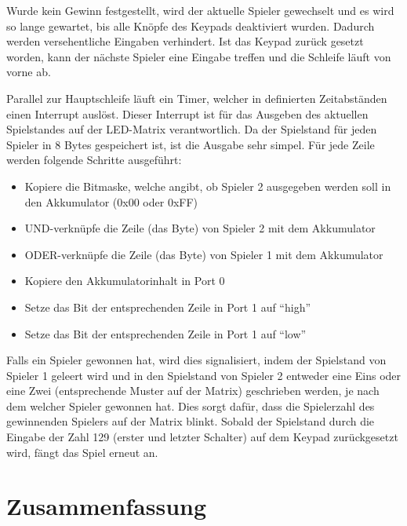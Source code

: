 Wurde kein Gewinn festgestellt, wird der aktuelle Spieler gewechselt und es wird so lange gewartet, bis alle Knöpfe des Keypads deaktiviert wurden. Dadurch werden versehentliche Eingaben verhindert. 
Ist das Keypad zurück gesetzt worden, kann der nächste Spieler eine Eingabe treffen und die Schleife läuft von vorne ab.

Parallel zur Hauptschleife läuft ein Timer, welcher in definierten Zeitabständen einen Interrupt auslöst.
Dieser Interrupt ist für das Ausgeben des aktuellen Spielstandes auf der LED-Matrix verantwortlich. 
Da der Spielstand für jeden Spieler in 8 Bytes gespeichert ist, ist die Ausgabe sehr simpel. Für jede Zeile werden folgende Schritte ausgeführt:
\begin{itemize}
	\item Kopiere die Bitmaske, welche angibt, ob Spieler 2 ausgegeben werden soll in den Akkumulator (0x00 oder 0xFF)
	\item UND-verknüpfe die Zeile (das Byte) von Spieler 2 mit dem Akkumulator
	\item ODER-verknüpfe die Zeile (das Byte) von Spieler 1 mit dem Akkumulator
	\item Kopiere den Akkumulatorinhalt in Port 0
	\item Setze das Bit der entsprechenden Zeile in Port 1 auf \enquote{high}
	\item Setze das Bit der entsprechenden Zeile in Port 1 auf \enquote{low}
\end{itemize}

Falls ein Spieler gewonnen hat, wird dies signalisiert, indem der Spielstand von Spieler 1 geleert wird und in den Spielstand von Spieler 2 entweder eine Eins oder eine Zwei (entsprechende Muster auf der Matrix) geschrieben werden, je nach dem welcher Spieler gewonnen hat.
Dies sorgt dafür, dass die Spielerzahl des gewinnenden Spielers auf der Matrix blinkt.
Sobald der Spielstand durch die Eingabe der Zahl 129 (erster und letzter Schalter) auf dem Keypad zurückgesetzt wird, fängt das Spiel erneut an.


\FloatBarrier
\chapter{Zusammenfassung}

